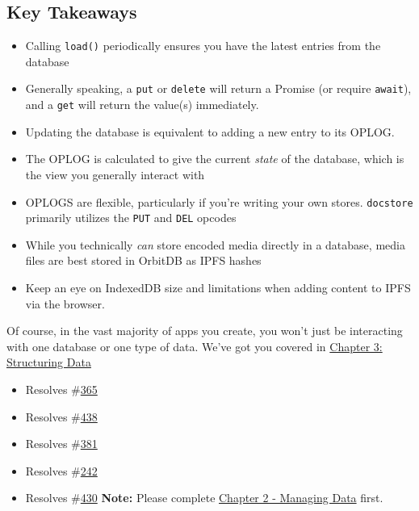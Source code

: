 \subsection{Key Takeaways}\label{key-takeaways-1}

\begin{itemize}
\tightlist
\item
  Calling \texttt{load()} periodically ensures you have the latest
  entries from the database
\item
  Generally speaking, a \texttt{put} or \texttt{delete} will return a
  Promise (or require \texttt{await}), and a \texttt{get} will return
  the value(s) immediately.
\item
  Updating the database is equivalent to adding a new entry to its
  OPLOG.
\item
  The OPLOG is calculated to give the current \emph{state} of the
  database, which is the view you generally interact with
\item
  OPLOGS are flexible, particularly if you're writing your own stores.
  \texttt{docstore} primarily utilizes the \texttt{PUT} and \texttt{DEL}
  opcodes
\item
  While you technically \emph{can} store encoded media directly in a
  database, media files are best stored in OrbitDB as IPFS hashes
\item
  Keep an eye on IndexedDB size and limitations when adding content to
  IPFS via the browser.
\end{itemize}

Of course, in the vast majority of apps you create, you won't just be
interacting with one database or one type of data. We've got you covered
in \href{03_Structuring_Data.md}{Chapter 3: Structuring Data}

\begin{itemize}
\tightlist
\item
  Resolves \#\href{https://github.com/orbitdb/orbit-db/issues/365}{365}
\item
  Resolves \#\href{https://github.com/orbitdb/orbit-db/issues/438}{438}
\item
  Resolves \#\href{https://github.com/orbitdb/orbit-db/issues/381}{381}
\item
  Resolves \#\href{https://github.com/orbitdb/orbit-db/issues/242}{242}
\item
  Resolves \#\href{https://github.com/orbitdb/orbit-db/issues/430}{430}
  \textbf{Note:} Please complete \href{./02_Managing_Data.md}{Chapter 2
  - Managing Data} first.
\end{itemize}

